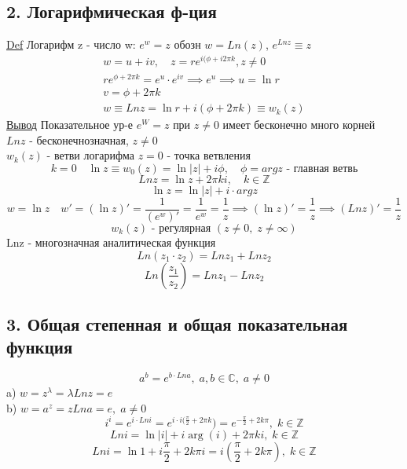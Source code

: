 \documentclass[a4paper]{article}
\begin{document}
    \subsection*{2. Логарифмическая ф-ция}
    \underline{Def} Логарифм z - число w: $ e^{w}= z $  обозн $ w = Ln(z) $, $ e^{Lnz}
    \equiv z$ \\
    \begin{equation*}
        \begin{aligned}
            w = u +iv, \quad z = r e ^{i(\phi + i 2 \pi k}, z \neq 0\\
            r e^{\phi + 2 \pi k} = e^{u} \cdot e^{iv} \implies e^{u} \implies
            u = \ln r \\
            v = \phi  + 2\pi k\\
            w \equiv Lnz = \ln r + i(\phi + 2\pi k) \equiv w_{k}(z)
        \end{aligned}
    \end{equation*}
    \underline{Вывод} Показательное ур-е $ e^{W} = z $ при $ z \neq 0 $ имеет
    бесконечно много корней \\
    $ Ln z $ - бесконечнозначная, $ z \neq 0 $ \\
    $  w_{k}(z)  $ - ветви логарифма $ z = 0 $ - точка ветвления \\
    \[
        k = 0 \quad \ln z \equiv w_0(z) = \ln|z| + i\phi, \quad \phi = argz \text{ - главная ветвь}
    \]
    \[
        Ln z = \ln z + 2\pi k i, \quad k \in \mathbb{Z}
    \]
    \[
        \ln z = \ln |z| + i \cdot argz
    \]
    \[
        w = \ln z \quad w' = (\ln z)' = \frac{1}{(e^{w})'} = \frac{1}{e^{w}} =
        \frac{1}{z} \implies (\ln z)' = \frac{1}{z} \implies (Lnz)' = \frac{1}{z} 
    \]
    \[
        w_k(z) \text{ - регулярная } (z \neq 0, \; z \neq \infty)
    \]
    Lnz - многозначная аналитическая функция
    \[
        Ln(z_1 \cdot z_2) = Ln z_1 + Ln z_2
    \]
    \[
        Ln \left(\frac{z_1}{z_2}\right) = Ln z_1 - Ln z_2
    \]
    \subsection*{3. Общая степенная и общая показательная функция}
    \[
        a^{b} = e^{b \cdot Ln a}, \; a,b \in \mathbb{C}, \; a \neq 0
    \]
    a) $ w = z^{\lambda} = \lambda Ln z = e $ \\
    b) $ w = a^{z} = z Ln a = e, \; a \neq 0 $ 
    \[
        i^{i} = e^{i \cdot Ln i} = e^{i \cdot i(\frac{\pi}{2} + 2 \pi k}) =
        e^{- \frac{\pi}{2} + 2k \pi}, \; k \in \mathbb{Z}
    \]
    \[
        Ln i = \ln |i| + i \arg(i) + 2 \pi k i, \; k \in \mathbb{Z}
    \]
    \[
        Ln i = \ln 1 + i \frac{\pi}{2} + 2 k \pi i = i(\frac{\pi}{2} + 2 k \pi), \;
        k \in \mathbb{Z}
    \]
\end{document}
